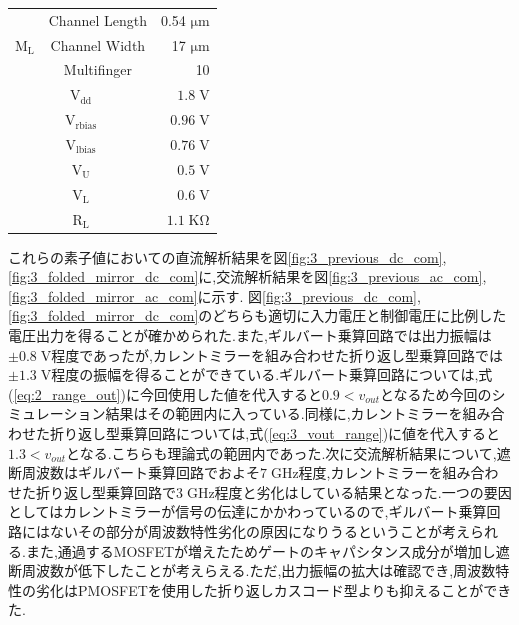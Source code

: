 \begin{table}[!b]
\begin{tabular}{c|c|r}
                    &   Channel Length   &   0.54 $\mathrm{\mu m}$   \\
                    \cline{2-3}
                    $\mathrm{M_{L}}$   &   Channel Width   &   17 $\mathrm{\mu m}$   \\
                    \cline{2-3}
                        &   Multifinger   & 10    \\
                    \hline
                    \multicolumn{2}{c|}{$\mathrm{V_{dd}}$} &   $1.8\;\mathrm{V}$   \\
                    \hline
                    \multicolumn{2}{c|}{$\mathrm{V_{rbias}}$} &   $0.96\;\mathrm{V}$   \\
                    \hline
                    \multicolumn{2}{c|}{$\mathrm{V_{lbias}}$} &   $0.76\;\mathrm{V}$   \\
                    \hline
                    \multicolumn{2}{c|}{$\mathrm{V_{U}}$} &   $0.5\;\mathrm{V}$   \\
                    \hline
                    \multicolumn{2}{c|}{$\mathrm{V_{L}}$} &   $0.6\;\mathrm{V}$   \\
                    \hline
                    \multicolumn{2}{c|}{$\mathrm{R_{L}}$} &   $1.1\;\mathrm{K \Omega}$   \\
                    \hline
            \end{tabular}
        \end{table}
        これらの素子値においての直流解析結果を図\ref{fig:3_previous_dc_com},\ref{fig:3_folded_mirror_dc_com}に,交流解析結果を図\ref{fig:3_previous_ac_com},\ref{fig:3_folded_mirror_ac_com}に示す.
        図\ref{fig:3_previous_dc_com},\ref{fig:3_folded_mirror_dc_com}のどちらも適切に入力電圧と制御電圧に比例した電圧出力を得ることが確かめられた.また,ギルバート乗算回路では出力振幅は$\pm 0.8\mathrm{\;V}$程度であったが,カレントミラーを組み合わせた折り返し型乗算回路では$\pm 1.3\mathrm{\;V}$程度の振幅を得ることができている.ギルバート乗算回路については,式(\ref{eq:2_range_out})に今回使用した値を代入すると$0.9 <v_{out}$となるため今回のシミュレーション結果はその範囲内に入っている.同様に,カレントミラーを組み合わせた折り返し型乗算回路については,式(\ref{eq:3_vout_range})に値を代入すると$1.3 < v_{out}$となる.こちらも理論式の範囲内であった.次に交流解析結果について,遮断周波数はギルバート乗算回路でおよそ$7\;\mathrm{GHz}$程度,カレントミラーを組み合わせた折り返し型乗算回路で$3\;\mathrm{GHz}$程度と劣化はしている結果となった.一つの要因としてはカレントミラーが信号の伝達にかかわっているので,ギルバート乗算回路にはないその部分が周波数特性劣化の原因になりうるということが考えられる.また,通過するMOSFETが増えたためゲートのキャパシタンス成分が増加し遮断周波数が低下したことが考えらえる.ただ,出力振幅の拡大は確認でき,周波数特性の劣化はPMOSFETを使用した折り返しカスコード型よりも抑えることができた.\clearpage
